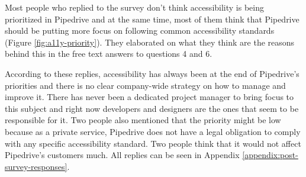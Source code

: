 \documentclass{master_thesis}
\begin{document}
Most people who replied to the survey don't think accessibility is being prioritized in Pipedrive and at the same time, most of them think that Pipedrive should be putting more focus on following common accessibility standards (Figure \ref{fig:a11y-priority}). They elaborated on what they think are the reasons behind this in the free text answers to questions 4 and 6.

According to these replies, accessibility has always been at the end of Pipedrive's priorities and there is no clear company-wide strategy on how to manage and improve it. There has never been a dedicated project manager to bring focus to this subject
and right now developers and designers are the ones that seem to be responsible for it. Two people also mentioned that the priority might be low because as a private service, Pipedrive does not have a legal obligation to comply with any specific accessibility standard. Two people think that it would not affect Pipedrive's customers much. All replies can be seen in  Appendix \ref{appendix:post-survey-responses}.
\end{document}
